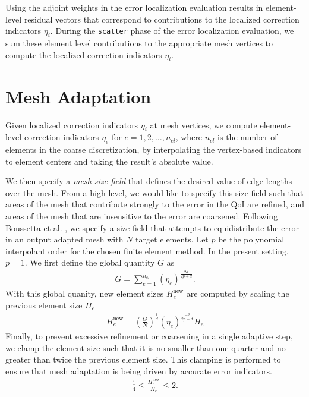 Using the adjoint weights in the error localization evaluation results in
element-level residual vectors that correspond to contributions to the
localized correction indicators $\eta_i$.
During the \texttt{scatter} phase of the error localization evaluation, we
sum these element level contributions to the appropriate mesh vertices
to compute the localized correction indicators $\eta_i$.

\section{Mesh Adaptation}

Given localized correction indicators $\eta_i$ at mesh
vertices, we compute element-level correction indicators $\eta_e$ for
$e = 1,2,\dots, n_{el}$, where $n_{el}$ is the number of elements in the
coarse discretization, by interpolating the vertex-based indicators to
element centers and taking the result's absolute value.

We then specify a \emph{mesh size field} that defines the desired value
of edge lengths over the mesh. From a high-level, we would like to specify
this size field such that areas of the mesh that contribute strongly to
the error in the QoI are refined, and areas of the mesh that are
insensitive to the error are coarsened. Following Boussetta et al.
\cite{boussetta2006adaptive}, we specify a size field that attempts to
equidistribute the error in an output adapted mesh with $N$ target
elements. Let $p$ be the polynomial interpolant order for the chosen
finite element method. In the present setting, $p=1$. We first define
the global quantity $G$ as
%
\begin{gather}
G = \sum_{e=1}^{n_{el}} ( \eta_e ) ^{\frac{2d}{2p+d}}.
\label{eq:aut_global_size_quantity}
\end{gather}
%
With this global quanity, new element sizes $H_e^{\text{new}}$ are
computed by scaling the previous element size $H_e$
%
\begin{gather}
H_e^{\text{new}} = \left( \frac{G}{N} \right)^{\frac{1}{d}}
( \eta_e )^{\frac{-2}{2p + d}} H_e
\label{eq:aut_size_field}
\end{gather}
%
Finally, to prevent excessive refinement or coarsening in a single
adaptive step, we clamp the element size such that it is no
smaller than one quarter and no greater than twice the previous
element size. This clamping is performed to ensure that mesh adaptation
is being driven by accurate error indicators.
%
\begin{gather}
\frac14 \leq \frac{H_e^{\text{new}}}{H_e} \leq 2.
\label{eq:aut_size_clamping}
\end{gather}

